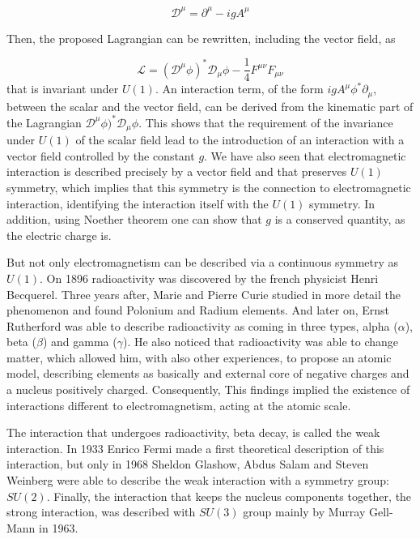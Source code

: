 \begin{equation}
  \label{eq:covderivU1}
  \mathcal{D}^{\mu}=\partial^{\mu}-igA^{\mu}
\end{equation}

Then, the proposed Lagrangian can be rewritten, including the vector field, as

\begin{equation}
  \label{eq:FullLagU1inv}
  \mathcal{L}=(\mathcal{D}^{\mu}\phi)^{*}\mathcal{D}_{\mu}\phi-\frac{1}{4}F^{\mu\nu}F_{\mu\nu}
\end{equation}that is invariant under $U(1)$. An interaction term, of the form $igA^{\mu}\phi^{*}\partial_{\mu}$, between the scalar and the vector field, can be derived from the kinematic part of the Lagrangian $\mathcal{D}^{\mu}\phi)^{*}\mathcal{D}_{\mu}\phi$. This shows that the requirement of the invariance under $U(1)$ of the scalar field lead to the introduction of an interaction with a vector field controlled by the constant $g$. We have also seen that electromagnetic interaction is described precisely by a vector field and that preserves $U(1)$ symmetry, which implies that this symmetry is the connection to electromagnetic interaction, identifying the interaction itself with the $U(1)$ symmetry. In addition, using Noether theorem one can show that $g$ is a conserved quantity, as the electric charge is.

But not only electromagnetism can be described via a continuous symmetry as $U(1)$. On 1896 radioactivity was discovered by the french physicist Henri Becquerel. Three years after, Marie and Pierre Curie studied in more detail the phenomenon and found Polonium and Radium elements. And later on, Ernst Rutherford was able to describe radioactivity as coming in three types, alpha ($\alpha$), beta ($\beta$) and gamma ($\gamma$). He also noticed that radioactivity was able to change matter, which allowed him, with also other experiences, to propose an atomic model, describing elements as basically and external core of negative charges and a nucleus positively charged. Consequently, This findings implied the existence of interactions different to electromagnetism, acting at the atomic scale.

The interaction that undergoes radioactivity, beta decay, is called the weak interaction. In 1933 Enrico Fermi made a first theoretical description of this interaction, but only in 1968 Sheldon Glashow, Abdus Salam and Steven Weinberg were able to describe the weak interaction with a symmetry group: $SU(2)$. Finally, the interaction that keeps the nucleus components together, the strong interaction, was described with $SU(3)$ group mainly by Murray Gell-Mann in 1963.

